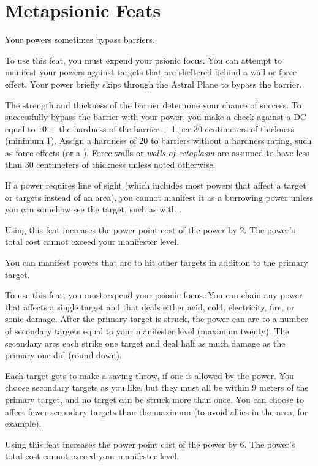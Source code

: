 \section{Metapsionic Feats}

{Your powers sometimes bypass barriers.}{}
{To use this feat, you must expend your psionic focus. You can attempt to manifest your powers against targets that are sheltered behind a wall or force effect. Your power briefly skips through the Astral Plane to bypass the barrier.

The strength and thickness of the barrier determine your chance of success. To successfully bypass the barrier with your power, you make a  check against a DC equal to 10 + the hardness of the barrier + 1 per 30 centimeters of thickness (minimum 1). Assign a hardness of 20 to barriers without a hardness rating, such as force effects (or a ). Force walls or \emph{walls of ectoplasm} are assumed to have less than 30 centimeters of thickness unless noted otherwise.

If a power requires line of sight (which includes most powers that affect a target or targets instead of an area), you cannot manifest it as a burrowing power unless you can somehow see the target, such as with .

Using this feat increases the power point cost of the power by 2. The power's total cost cannot exceed your manifester level.}{}{}

{You can manifest powers that arc to hit other targets in addition to the primary target.}
{}
{To use this feat, you must expend your psionic focus. You can chain any power that affects a single target and that deals either acid, cold, electricity, fire, or sonic damage. After the primary target is struck, the power can arc to a number of secondary targets equal to your manifester level (maximum twenty). The secondary arcs each strike one target and deal half as much damage as the primary one did (round down).

Each target gets to make a saving throw, if one is allowed by the power. You choose secondary targets as you like, but they must all be within 9 meters of the primary target, and no target can be struck more than once. You can choose to affect fewer secondary targets than the maximum (to avoid allies in the area, for example).

Using this feat increases the power point cost of the power by 6. The power's total cost cannot exceed your manifester level.}{}{}

